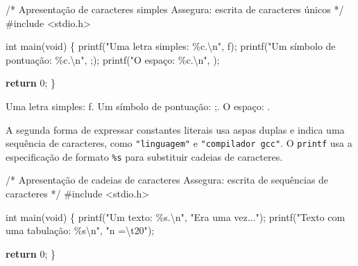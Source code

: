 \documentclass[
  letterpaper,
  DIV=11,
  numbers=noendperiod]{scrartcl}
\newenvironment{Shaded}{\begin{snugshade}}{\end{snugshade}}
\newcommand{\CharTok}[1]{\textcolor[rgb]{0.13,0.47,0.30}{#1}}
\newcommand{\CommentTok}[1]{\textcolor[rgb]{0.37,0.37,0.37}{#1}}
\newcommand{\ControlFlowTok}[1]{\textcolor[rgb]{0.00,0.23,0.31}{\textbf{#1}}}
\newcommand{\DataTypeTok}[1]{\textcolor[rgb]{0.68,0.00,0.00}{#1}}
\newcommand{\DecValTok}[1]{\textcolor[rgb]{0.68,0.00,0.00}{#1}}
\newcommand{\ImportTok}[1]{\textcolor[rgb]{0.00,0.46,0.62}{#1}}
\newcommand{\NormalTok}[1]{\textcolor[rgb]{0.00,0.23,0.31}{#1}}
\newcommand{\OperatorTok}[1]{\textcolor[rgb]{0.37,0.37,0.37}{#1}}
\newcommand{\PreprocessorTok}[1]{\textcolor[rgb]{0.68,0.00,0.00}{#1}}
\newcommand{\SpecialCharTok}[1]{\textcolor[rgb]{0.37,0.37,0.37}{#1}}
\newcommand{\StringTok}[1]{\textcolor[rgb]{0.13,0.47,0.30}{#1}}
\begin{document}
\begin{Shaded}
\begin{Highlighting}[]
\CommentTok{/*}
\CommentTok{Apresentação de caracteres simples}
\CommentTok{Assegura: escrita de caracteres únicos}
\CommentTok{*/}
\PreprocessorTok{\#include }\ImportTok{\textless{}stdio.h\textgreater{}}

\DataTypeTok{int}\NormalTok{ main}\OperatorTok{(}\DataTypeTok{void}\OperatorTok{)} \OperatorTok{\{}
\NormalTok{    printf}\OperatorTok{(}\StringTok{"Uma letra simples: }\SpecialCharTok{\%c}\StringTok{.}\SpecialCharTok{\textbackslash{}n}\StringTok{"}\OperatorTok{,} \CharTok{\textquotesingle{}f\textquotesingle{}}\OperatorTok{);}
\NormalTok{    printf}\OperatorTok{(}\StringTok{"Um símbolo de pontuação: }\SpecialCharTok{\%c}\StringTok{.}\SpecialCharTok{\textbackslash{}n}\StringTok{"}\OperatorTok{,} \CharTok{\textquotesingle{};\textquotesingle{}}\OperatorTok{);}
\NormalTok{    printf}\OperatorTok{(}\StringTok{"O espaço: }\SpecialCharTok{\%c}\StringTok{.}\SpecialCharTok{\textbackslash{}n}\StringTok{"}\OperatorTok{,} \CharTok{\textquotesingle{} \textquotesingle{}}\OperatorTok{);}

    \ControlFlowTok{return} \DecValTok{0}\OperatorTok{;}
\OperatorTok{\}}
\end{Highlighting}
\end{Shaded}

\begin{Shaded}
\begin{Highlighting}[]
\NormalTok{Uma letra simples: f.}
\NormalTok{Um símbolo de pontuação: ;.}
\NormalTok{O espaço:  .}
\end{Highlighting}
\end{Shaded}

A segunda forma de expressar constantes literais usa aspas duplas e
indica uma sequência de caracteres, como \texttt{"linguagem"} e
\texttt{"compilador\ gcc"}. O \texttt{printf} usa a especificação de
formato \texttt{\%s} para substituir cadeias de caracteres.

\begin{Shaded}
\begin{Highlighting}[]
\CommentTok{/*}
\CommentTok{Apresentação de cadeias de caracteres}
\CommentTok{Assegura: escrita de sequências de caracteres}
\CommentTok{*/}
\PreprocessorTok{\#include }\ImportTok{\textless{}stdio.h\textgreater{}}

\DataTypeTok{int}\NormalTok{ main}\OperatorTok{(}\DataTypeTok{void}\OperatorTok{)} \OperatorTok{\{}
\NormalTok{    printf}\OperatorTok{(}\StringTok{"Um texto: }\SpecialCharTok{\%s}\StringTok{.}\SpecialCharTok{\textbackslash{}n}\StringTok{"}\OperatorTok{,} \StringTok{"Era uma vez..."}\OperatorTok{);}
\NormalTok{    printf}\OperatorTok{(}\StringTok{"Texto com uma tabulação: }\SpecialCharTok{\%s\textbackslash{}n}\StringTok{"}\OperatorTok{,} \StringTok{"n =}\SpecialCharTok{\textbackslash{}t}\StringTok{20"}\OperatorTok{);}

    \ControlFlowTok{return} \DecValTok{0}\OperatorTok{;}
\OperatorTok{\}}
\end{Highlighting}
\end{Shaded}
\end{document}

